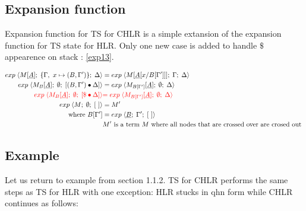 \documentclass[a4paper, 10pt]{article}
\begin{document}
\subsection{Expansion function}

Expansion function for TS for CHLR is a simple extansion of the expansion function for TS state for HLR.
Only one new case is added to handle $\$$ appearence on stack : \eqref{exp13}.

\begin{align}
  \label{exp11} exp\; \langle M[\underline{A}];\; \{\Gamma,\ x \mapsto (B, \Gamma')\};\; \Delta \rangle
  &= exp\; \langle M[\underline{A}[x / B[\Gamma']]];\; \Gamma;\; \Delta \rangle \\
  \label{exp12} exp\; \langle M_B[\underline{A}];\; \emptyset;\; [(B,\Gamma')\bullet\Delta] \rangle
  &= exp\; \langle M_{B[\Gamma']}[\underline{A}];\; \emptyset;\; \Delta \rangle\\
  \label{exp13}  {\color{red} exp\; \langle M_B[\underline{A}];\; \emptyset;\;  [\$ \bullet \Delta] \rangle}
  &{\color{red}= exp\; \langle M_{B[\Gamma']}[\underline{A}];\; \emptyset;\; \Delta \rangle } \\
  \label{exp14} exp\; \langle M;\; \emptyset;\; [\ ] \rangle &= M' \\
  \textnormal{where } B[\Gamma'] &= exp\; \langle \underline{B};\; \Gamma';\; [\ ] \rangle \\
  & M' \textnormal{ is a term } M \textnormal{ where all nodes that are crossed over are crosed out }
\end{align}


\subsection{Example}
Let us return to example from section 1.1.2. TS for CHLR performs the same steps as TS for HLR
with one exception: HLR stucks in qhn form while CHLR continues as follows:
\end{document}
